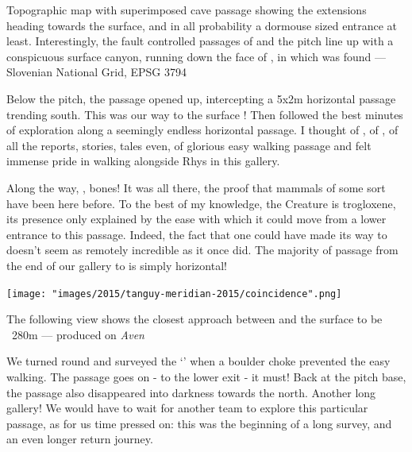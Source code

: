 \begin{map}[t!]
\caption[Meridian way topographic map]{Topographic map with superimposed cave passage showing the \protect{} extensions heading towards the surface, and in all probability a dormouse sized entrance at least. Interestingly, the fault controlled passages of \protect{} and the \protect{} pitch line up with a conspicuous surface canyon, running down the face of \protect{}, in which \protect{} was found --- Slovenian National Grid, EPSG 3794}
\label{map:meridianmap}
\end{map}


Below the pitch, the passage opened up, intercepting a 5x2m horizontal passage trending south. This was our way to the surface ! Then followed the best minutes of exploration along a seemingly endless horizontal passage. I thought of , of , of all the reports, stories, tales even, of glorious easy walking passage and felt immense pride in walking alongside Rhys in this gallery.

Along the way, , bones! It was all there, the proof that mammals of some sort have been here before. To the best of my knowledge, the Creature is trogloxene, its presence only explained by the ease with which it could move from a lower entrance to this passage. Indeed, the fact that one could have made its way to  doesn't seem as remotely incredible as it once did. The majority of passage from the end of our gallery to  is simply horizontal!

\begin{survey*}[t!]
\checkoddpage \ifoddpage \forcerectofloat \else \forceversofloat \fi
\texttt{[image: "images/2015/tanguy-meridian-2015/coincidence".png]}
\caption[Aven view of Empty Quarter]{The following view shows the closest approach between \protect{} and the surface to be ~280m --- produced on \emph{Aven}}
\end{survey*}

We turned round and surveyed the `' when a boulder choke prevented the easy walking. The passage goes on - to the lower exit - it must! Back at the pitch base, the passage also disappeared into darkness towards the north. Another long gallery! We would have to wait for another team to explore this particular passage, as for us time pressed on: this was the beginning of a long survey, and an even longer return journey.

